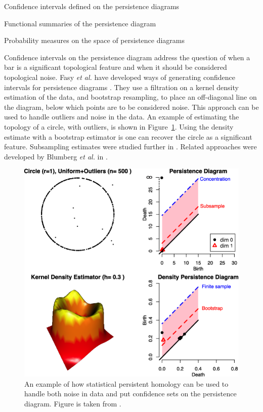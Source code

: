 \begin{compactenum}
\item Confidence intervals defined on the persistence diagrams
\item Functional summaries of the persistence diagram
\item Probability measures on the space of persistence diagrams
\end{compactenum}

Confidence intervals on the persistence diagram address the question of when a bar is a significant topological feature and when it should be considered topological noise.
Fasy \emph{et al.} have developed ways of generating confidence intervals for persistence diagrams \cite{Fasy:2014}.
They use a filtration on a kernel density estimation of the data, and bootstrap resampling, to place an off-diagonal line on the diagram, below which points are to be considered noise.
This approach can be used to handle outliers and noise in the data.
An example of estimating the topology of a circle, with outliers, is shown in Figure~\ref{fig:bg:fasy_confidence_set}.
Using the density estimate with a bootstrap estimator is one can recover the circle as a significant feature.
Subsampling estimates were studied further in \cite{Chazal:2014wp}.
Related approaches were developed by Blumberg \emph{et al.} in \cite{Blumberg:2014bq}.

\begin{figure}
	\centering
	\includegraphics[]{fig/background/fasy_confidence_set.pdf}
	\caption[Confidence sets on the persistence diagram]{An example of how statistical persistent homology can be used to handle both noise in data and put confidence sets on the persistence diagram. Figure is taken from \cite{Fasy:2014}.}
	\label{fig:bg:fasy_confidence_set}
\end{figure}

